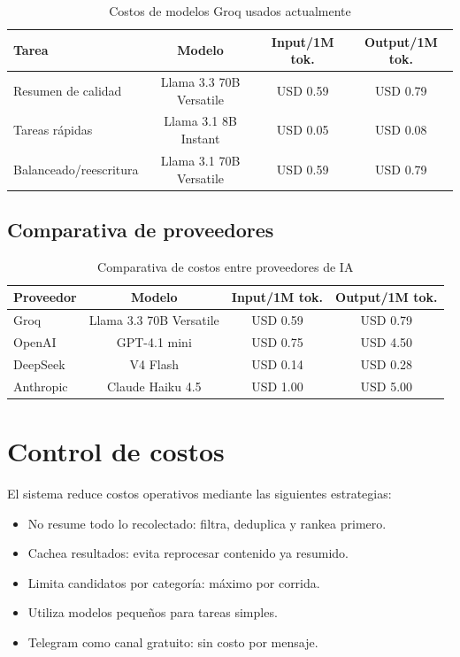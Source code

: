 \begin{table}[H]
\centering
\begin{tabular}{lccc}
\toprule
\textbf{Tarea} & \textbf{Modelo} & \textbf{Input/1M tok.} & \textbf{Output/1M tok.} \\
\midrule
Resumen de calidad & Llama 3.3 70B Versatile & USD 0.59 & USD 0.79 \\
Tareas r\'apidas & Llama 3.1 8B Instant & USD 0.05 & USD 0.08 \\
Balanceado/reescritura & Llama 3.1 70B Versatile & USD 0.59 & USD 0.79 \\
\bottomrule
\end{tabular}
\caption{Costos de modelos Groq usados actualmente}
\end{table}

\subsection{Comparativa de proveedores}

\begin{table}[H]
\centering
\begin{tabular}{lccc}
\toprule
\textbf{Proveedor} & \textbf{Modelo} & \textbf{Input/1M tok.} & \textbf{Output/1M tok.} \\
\midrule
Groq & Llama 3.3 70B Versatile & USD 0.59 & USD 0.79 \\
OpenAI & GPT-4.1 mini & USD 0.75 & USD 4.50 \\
DeepSeek & V4 Flash & USD 0.14 & USD 0.28 \\
Anthropic & Claude Haiku 4.5 & USD 1.00 & USD 5.00 \\
\bottomrule
\end{tabular}
\caption{Comparativa de costos entre proveedores de IA}
\end{table}

\section{Control de costos}

El sistema reduce costos operativos mediante las siguientes estrategias:

\begin{itemize}[nosep]
    \item No resume todo lo recolectado: filtra, deduplica y rankea primero.
    \item Cachea resultados: evita reprocesar contenido ya resumido.
    \item Limita candidatos por categor\'ia: m\'aximo por corrida.
    \item Utiliza modelos peque\~nos para tareas simples.
    \item Telegram como canal gratuito: sin costo por mensaje.
\end{itemize}

